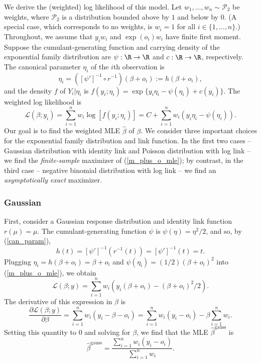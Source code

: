 \documentclass[11pt]{article}
\begin{document}
\begin{appendices}
\begin{refsection}
We derive the (weighted) log likelihood of this model. Let $w_1, \dots, w_n \sim \mathcal{P}_2$ be weights, where $\mathcal{P}_2$ is a distribution bounded above by $1$ and below by $0$. (A special case, which corresponds to no weights, is $w_i = 1$ for all $i \in \{1, \dots, n\}$.) Throughout, we assume that $y_iw_i$ and $\exp(o_i)w_i$ have finite first moment.  Suppose the cumulant-generating function and carrying density of the exponential family distribution are $\psi:\R \to \R$ and $c: \R \to \R$, respectively. The canonical parameter $\eta_i$ of the $i$th observation is 
\begin{equation}\label{can_param}
\eta_i = ([\psi']^{-1} \circ r^{-1})(\beta + o_i) := h(\beta + o_i),
\end{equation}
 and the density $f$ of $Y_i | \eta_i$ is
$f(y_i; \eta_i) = \exp\{y_i \eta_i - \psi(\eta_i) + c(y_i)\}.$ The weighted log likelihood is
\begin{equation}\label{m_plus_o_mle}
\mathcal{L}(\beta;y_i) = \sum_{i=1}^n w_i\log\left[f(y_i;\eta_i)\right] = C + \sum_{i=1}^n w_i(y_i \eta _i - \psi(\eta_i)).
\end{equation}
Our goal is to find the weighted MLE $\hat{\beta}$ of $\beta$. We consider three important choices for the exponential family distribution and link function. %
In the first two cases -- Gaussian distribution with identity link and Poisson distribution with log link -- we find the \textit{finite-sample} maximizer of (\ref{m_plus_o_mle}); by contrast, in the third case -- negative binomial distribution with log link -- we find an \textit{asymptotically exact} maximizer.

\subsubsection*{Gaussian}
First, consider a Gaussian response distribution and identity link function $r(\mu) = \mu$. The cumulant-generating function $\psi$ is $\psi(\eta) = \eta^2/2$, and so, by (\ref{can_param}),
$$h(t) = [\psi']^{-1}( r^{-1}(t)) = [\psi']^{-1}(t) = t.$$
Plugging $\eta_i = h(\beta + o_i) = \beta + o_i$ and $\psi(\eta_i) = (1/2)(\beta + o_i)^2$ into (\ref{m_plus_o_mle}), we obtain
$$\mathcal{L}(\beta; y) = \sum_{i=1}^n w_i (y_i(\beta + o_i) - (\beta + o_i)^2/2).$$ The derivative of this expression in $\beta$ is
$$\frac{\partial \mathcal{L}(\beta;y)}{\partial\beta} = \sum_{i=1}^n w_i (y_i - \beta - o_i) = \sum_{i=1}^n w_i(y_i - o_i) - \beta \sum_{i=1}^n w_i.$$ Setting this quantity to 0 and solving for $\beta$, we find that the MLE $\hat{\beta}^\textrm{gauss}$ is
$$\hat{\beta}^\textrm{gauss} = \frac{\sum_{i=1}^n w_i (y_i - o_i)}{\sum_{i=1}^n w_i}.$$


\end{refsection}
\end{appendices}
\end{document}
